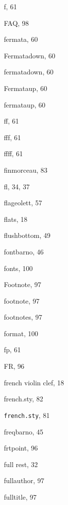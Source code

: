 \begin{theindex}
  \item {\Bslash f}, 61
  \item FAQ, 98
  \item fermata, 60
  \item {\Bslash Fermatadown}, 60
  \item {\Bslash fermatadown}, 60
  \item {\Bslash Fermataup}, 60
  \item {\Bslash fermataup}, 60
  \item {\Bslash ff}, 61
  \item {\Bslash fff}, 61
  \item {\Bslash ffff}, 61
  \item {\Bslash finmorceau}, 83
  \item {\Bslash fl}, 34, 37
  \item {\Bslash flageolett}, 57
  \item flats, 18
  \item {\Bslash flushbottom}, 49
  \item {\Bslash fontbarno}, 46
  \item fonts, 100
  \item {\Bslash Footnote}, 97
  \item {\Bslash footnote}, 97
  \item footnotes, 97
  \item format, 100
  \item {\Bslash fp}, 61
  \item {\Bslash FR}, 96
  \item french violin clef, 18
  \item french.sty, 82
  \item {\tt  french.sty}, 81
  \item {\Bslash freqbarno}, 45
  \item {\Bslash frtpoint}, 96
  \item full rest, 32
  \item {\Bslash fullauthor}, 97
  \item {\Bslash fulltitle}, 97

  \indexspace


\end{theindex}
